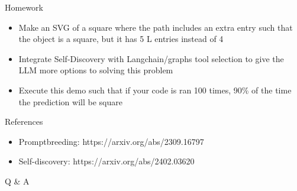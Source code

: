 \documentclass[aspectratio=169]{beamer}
\begin{document}
\begin{frame}{Homework}

\begin{itemize}
\item Make an SVG of a square where the path includes an extra entry such that the object is a square, but it has 5 L entries instead of 4 \pause 
\item Integrate Self-Discovery with Langchain/graphs tool selection to give the LLM more options to solving this problem \pause 
\item Execute this demo such that if your code is ran 100 times, 90\% of the time the prediction will be square
\end{itemize}

\end{frame}


\begin{frame}{References}

\begin{itemize}
    \item Promptbreeding: https://arxiv.org/abs/2309.16797
    \item Self-discovery: https://arxiv.org/abs/2402.03620
\end{itemize}


\end{frame}


\begin{frame}
\begin{center}
{\Huge Q \& A}
\end{center}
\end{frame}
\end{document}
